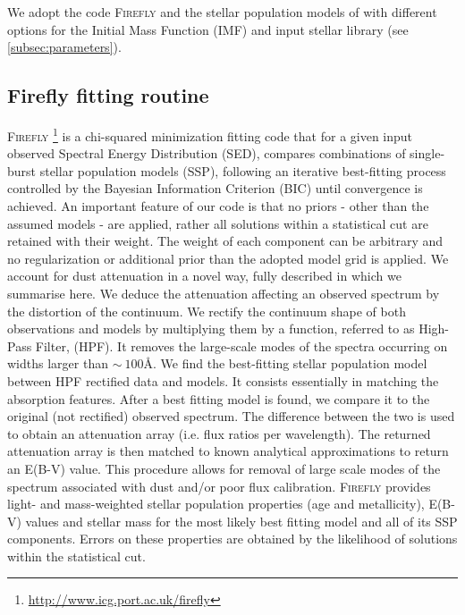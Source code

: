 \documentclass[onecolumn]{aa}
\begin{document}
We adopt the code \textsc{Firefly} \citep{firefly2017MNRAS} and the stellar population models of \citet{Maraston_2011} with different options for the Initial Mass Function (IMF) and input stellar library (see \ref{subsec:parameters}).

\subsection{Firefly fitting routine}
\textsc{Firefly}
\footnote{\url{http://www.icg.port.ac.uk/firefly}} 
is a chi-squared minimization fitting code that for a given input observed Spectral Energy Distribution (SED), 
compares combinations of single-burst stellar population models (SSP), 
following an iterative best-fitting process controlled by the Bayesian 
Information Criterion (BIC) until convergence is achieved. 
An important feature of our code is that no priors - other than the assumed models - are applied, rather all solutions within a statistical cut are retained with their weight.
The weight of each component can be arbitrary and no regularization or additional prior than the adopted model grid is applied. 
We account for dust attenuation in a novel way, fully described in \citet{firefly2017MNRAS} which we summarise here. 
We deduce the attenuation affecting an observed spectrum by the distortion of the continuum. 
We rectify the continuum shape %
of both observations and models by multiplying them by a function, referred to as High-Pass Filter, (HPF). 
It removes the large-scale modes of the spectra occurring on widths larger than $\sim~100$\AA. 
We find the best-fitting stellar population model between HPF rectified data and models. 
It consists essentially in matching the absorption features. 
After a best fitting model is found, we compare it to the original (not rectified) observed spectrum. The difference between the two is used to obtain an attenuation array (i.e. flux ratios per wavelength). 
The returned attenuation array is then matched to known analytical approximations to return an E(B-V) value. 
This procedure allows for removal of large scale modes of the spectrum associated with dust and/or poor flux calibration.	
\textsc{Firefly} provides light- and mass-weighted stellar population properties (age and metallicity), E(B-V) values and stellar mass for the most likely best fitting model and all of its SSP components.  
Errors on these properties are obtained by the likelihood of solutions within the statistical cut. 
\end{document}
